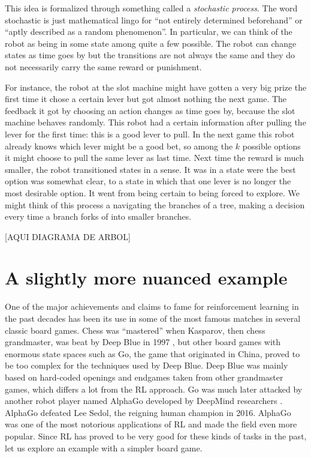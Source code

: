 This idea is formalized through something called a 
\textit{stochastic process}. The word stochastic is just 
mathematical lingo for ``not entirely determined beforehand'' 
or ``aptly described as a random phenomenon''.  In particular, 
we can think of the robot as being in some state among quite a 
few possible. The robot can change states as time goes by but 
the transitions are not always the same and they do not 
necessarily carry the same reward or punishment.

For instance, the robot at the slot machine might have gotten a 
very big prize the first time it chose a certain lever but got 
almost nothing the next game. The feedback it got by choosing 
an action changes as time goes by, because the slot machine 
behaves randomly. This robot had a certain information after 
pulling the lever for the first time: this is a good lever to 
pull. In the next game this robot already knows which lever 
might be a good bet, so among the $k$ possible options it might 
choose to pull the same lever as last time. Next time the 
reward is much smaller, the robot transitioned states in a 
sense. It was in a state were the best option was somewhat 
clear, to a state in which that one lever is no longer the most 
desirable option. It went from being certain to being forced to 
explore. We might think of this process a navigating the 
branches of a tree, making a decision every time a branch forks 
of into smaller branches.

[AQUI DIAGRAMA DE ARBOL]

\section{A slightly more nuanced example}
One of the major achievements and claims to fame for 
reinforcement learning in the past decades has been its use in 
some of the most famous matches in several classic board games.  
Chess was ``mastered'' when Kasparov, then chess grandmaster, 
was beat by Deep Blue in 1997 \cite{silverchess}, but other 
board games with enormous state spaces such as Go, the game 
that originated in China, proved to be too complex for the 
techniques used by Deep Blue. Deep Blue was mainly based on 
hard-coded openings and endgames taken from other grandmaster 
games, which differs a lot from the RL approach. Go was much 
later attacked by another robot player named AlphaGo developed 
by DeepMind researchers \cite{silver2017mastering}.  AlphaGo 
defeated Lee Sedol, the reigning human champion in 2016.  
AlphaGo was one of the most notorious applications of RL and 
made the field even more popular. Since RL has proved to be 
very good for these kinds of tasks in the past, let us explore 
an example with a simpler board game.

